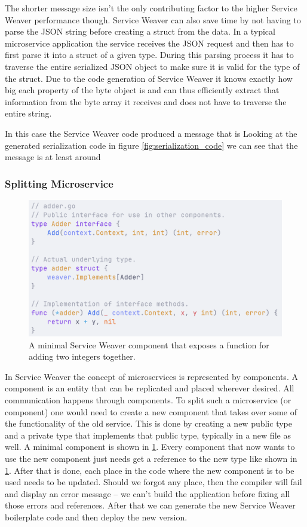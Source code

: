 \documentclass[sigconf,review,9pt]{acmart}
\begin{document}
The shorter message size isn't the only contributing factor to the higher Service Weaver
performance though.
Service Weaver can also save time by not having to parse the JSON string before
creating a struct from the data.
In a typical microservice application the service receives the JSON request and
then has to first parse it into a struct of a given type.
During this parsing process it has to traverse the entire serialized JSON object
to make sure it is valid for the type of the struct.
Due to the code generation of Service Weaver it knows exactly how big each property
of the byte object is and can thus efficiently extract that information from the
byte array it receives and does not have to traverse the entire string.


In this case the Service Weaver code produced a message that is
Looking at the generated serialization code in figure \ref{fig:serialization_code}
we can see that the message is at least around

\subsubsection{Splitting Microservice}

\begin{figure}
	\includegraphics[width=\columnwidth]{minimal_component}
	\caption{A minimal Service Weaver component that exposes a function
		for adding two integers together.}
	\label{fig:minimal_component}
\end{figure}

In Service Weaver the concept of microservices is represented by components.
A component is an entity that can be replicated and placed wherever desired.
All communication happens through components.
To split such a microservice (or component) one would need to create a new
component that takes over some of the functionality of the old service.
This is done by creating a new public type and a private type that implements
that public type, typically in a new file as well.
A minimal component is shown in \ref{fig:minimal_component}.
Every component that now wants to use the new component just needs get a reference
to the new type like shown in \ref{fig:minimal_component}.
After that is done, each place in the code where the new component is to be used
needs to be updated.
Should we forgot any place, then the compiler will fail and display an error message
-- we can't build the application before fixing all those errors and references.
After that we can generate the new Service Weaver boilerplate code and then deploy
the new version.
\end{document}
